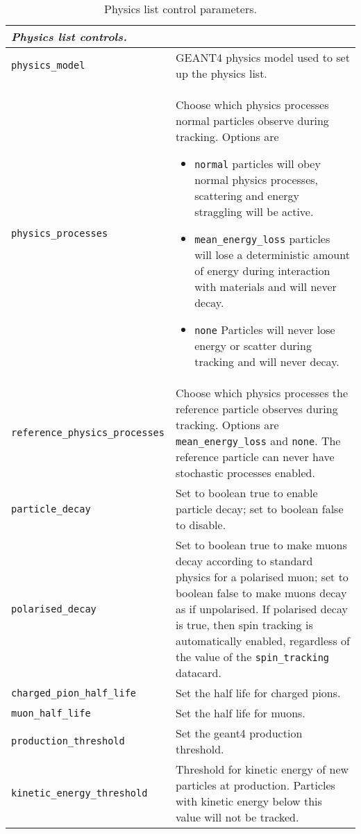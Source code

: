 \begin{table*}
\begin{center}
\caption{Physics list control parameters.}
\begin{tabularx}{\textwidth}{lX}
\hline
\multicolumn{2}{l}{\emph{Physics list controls.}} \\
\hline
\verb|physics_model| & GEANT4 physics model used to set up the physics list.\\
\verb|physics_processes| & Choose which physics processes normal particles observe during tracking. Options are 
                            \begin{itemize}
                            \item \verb|normal| particles will obey normal physics processes, scattering and energy straggling will be active.
                            \item \verb|mean_energy_loss| particles will lose a deterministic amount of energy during interaction with materials and will never decay.
                            \item \verb|none| Particles will never lose energy or scatter during tracking and will never decay.
                            \end{itemize} \\
\verb|reference_physics_processes| & Choose which physics processes the reference particle observes during tracking. Options are \verb|mean_energy_loss| and \verb|none|. The reference particle can never have stochastic processes enabled.\\
\verb|particle_decay| & Set to boolean true to enable particle decay; set to boolean false to disable.\\
\verb|polarised_decay| & Set to boolean true to make muons decay according to standard physics for a polarised muon; set to boolean false to make muons decay as if unpolarised. If polarised decay is true, then spin tracking is automatically enabled, regardless of the value of the \verb|spin_tracking| datacard.\\
\verb|charged_pion_half_life| & Set the half life for charged pions.\\
\verb|muon_half_life| & Set the half life for muons.\\
\verb|production_threshold| & Set the geant4 production threshold.\\
\verb|kinetic_energy_threshold| & Threshold for kinetic energy of new particles at production. Particles with kinetic energy below this value will not be tracked.\\

\end{tabularx}
\end{center}
\end{table*}
